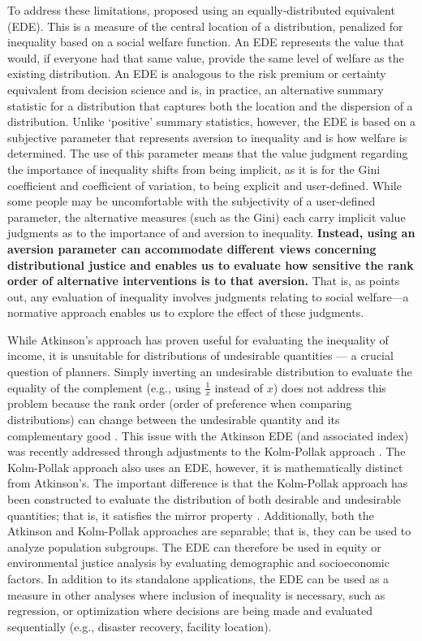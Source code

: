 \documentclass[final,3p,times,onecolumn,sort&compress]{elsarticle}
\begin{document}
To address these limitations, \cite{Atkinson1970-mr} proposed using an equally-distributed equivalent (EDE).
This is a measure of the central location of a distribution, penalized for inequality based on a social welfare function.
An EDE represents the value that would, if everyone had that same value, provide the same level of welfare as the existing distribution.
An EDE is analogous to the risk premium or certainty equivalent from decision science and is, in practice, an alternative summary statistic for a distribution that captures both the location and the dispersion of a distribution.
Unlike ‘positive’ summary statistics, however, the EDE is based on a subjective parameter that represents aversion to inequality and is how welfare is determined.
The use of this parameter means that the value judgment regarding the importance of inequality shifts from being implicit, as it is for the Gini coefficient and coefficient of variation, to being explicit and user-defined.
While some people may be uncomfortable with the subjectivity of a user-defined parameter, the alternative measures (such as the Gini) each carry implicit value judgments as to the importance of and aversion to inequality.
\textbf{Instead, using an aversion parameter can accommodate different views concerning distributional justice and enables us to evaluate how sensitive the rank order of alternative interventions is to that aversion.}
That is, as \cite{Atkinson1970-mr} points out, any evaluation of inequality involves judgments relating to social welfare---a normative approach enables us to explore the effect of these judgments.

While Atkinson's approach has proven useful for evaluating the inequality of income, it is unsuitable for distributions of undesirable quantities \citep{Cox2012-lg, Sheriff2020-ge, Maguire2011-fi, Fann2011-hd} — a crucial question of planners.
Simply inverting an undesirable distribution to evaluate the equality of the complement (e.g., using $\frac{1}{x}$ instead of $x$) does not address this problem because the rank order (order of preference when comparing distributions) can change between the undesirable quantity and its complementary good \citep{Sheriff2020-ge, Cox2012-lg, Erreygers2009-is}.
This issue with the Atkinson EDE (and associated index) was recently addressed through adjustments to the Kolm-Pollak approach \citep{Sheriff2020-ge}. 
The Kolm-Pollak approach also uses an EDE, however, it is mathematically distinct from Atkinson’s. 
The important difference is that the Kolm-Pollak approach has been constructed to evaluate the distribution of both desirable and undesirable quantities; that is, it satisfies the mirror property \citep{Sheriff2020-ge}. 
Additionally, both the Atkinson and Kolm-Pollak approaches are separable; that is, they can be used to analyze population subgroups. 
The EDE can therefore be used in equity or environmental justice analysis by evaluating demographic and socioeconomic factors. 
In addition to its standalone applications, the EDE can be used as a measure in other analyses where inclusion of inequality is necessary, such as regression, or optimization where decisions are being made and evaluated sequentially (e.g., disaster recovery, facility location).
\end{document}
